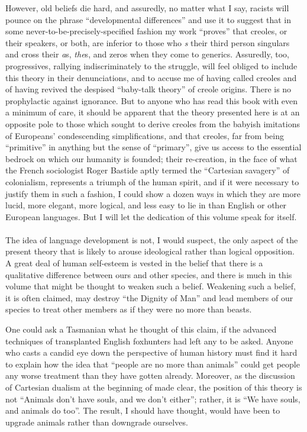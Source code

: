 However, old beliefs die hard, and assuredly, no matter what I say, racists will pounce on the phrase ``developmental differences'' and use it to suggest that in some never-to-be-precisely-specified fashion my work ``proves'' that creoles, or their speakers, or both, are inferior to those who \textit{s} their third person singulars and cross their \textit{a}s, \textit{the}s, and zeros when they come to generics. Assuredly, too, progressives, rallying indiscriminately to the struggle, will feel obliged to include this theory in their denunciations, and to accuse me of having called creoles  and of having revived the despised ``baby-talk theory'' of creole origins. There is no prophylactic against ignorance. But to anyone who has read this book with even a minimum of care, it should be apparent that the theory presented here is at an opposite pole to those which sought to derive creoles from the babyish imitations of Europeans' condescending simplifications, and that creoles, far from being ``primitive'' in anything but the sense of ``primary'', give us access to the essential bedrock on which our humanity is founded; their re-creation, in the face of what the French sociologist Roger Bastide aptly termed the ``Cartesian savagery'' of colonialism, represents a triumph of the human spirit, and if it were necessary to justify them in such a fashion, I could show a dozen ways in which they are more lucid, more elegant, more logical, and less easy to lie in than English or other European languages. But I will let the dedication of this volume speak for itself.\\\\

The idea of language development is not, I would suspect, the only aspect of the present theory that is likely to arouse ideological rather than logical opposition. A great deal of human self-esteem is vested in the belief that there is a qualitative difference between ours and other species, and there is much in this volume that might be thought to weaken such a belief. Weakening such a belief, it is often claimed, may destroy ``the Dignity of Man'' and lead members of our species to treat other members as if they were no more than beasts.

One could ask a Tasmanian what he thought of this claim, if the advanced techniques of transplanted English foxhunters had
left any  to be asked. Anyone who casts a candid eye down the perspective of human history must find it hard to explain how the idea that ``people are no more than animals'' could get people any worse treatment than they have gotten already. Moreover, as the discussion of Cartesian dualism at the beginning of  made clear, the position of this theory is not ``Animals don't have souls, and we don't either''; rather, it is ``We have souls, and animals do too''. The result, I should have thought, would have been to upgrade animals rather than downgrade ourselves.

